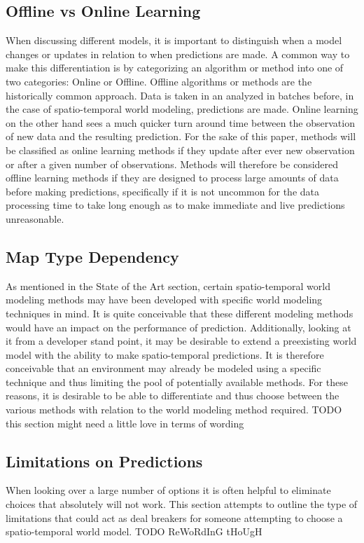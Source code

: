   \subsection{ Offline vs Online Learning }
  When discussing different models, it is important to distinguish when a model
  changes or updates in relation to when predictions are made. A common way to
  make this differentiation is by categorizing an algorithm or method into one of
  two categories: Online or Offline. Offline algorithms or methods are the
  historically common approach. Data is taken in an analyzed in batches before,
  in the case of spatio-temporal world modeling, predictions are made. Online
  learning on the other hand sees a much quicker turn around time between the
  observation of new data and the resulting prediction. \cite{Karp1992} For the sake of this
  paper, methods will be classified as online learning methods if they update
  after ever new observation or after a given number of observations. Methods
  will therefore be considered offline learning methods if they are designed to
  process large amounts of data before making predictions, specifically if it
  is not uncommon for the data processing time to take long enough as to make
  immediate and live predictions unreasonable.

  \subsection{ Map Type Dependency }
  As mentioned in the State of the Art section, certain spatio-temporal world
  modeling methods may have been developed with specific world modeling techniques in
  mind. It is quite conceivable that these different modeling methods would
  have an impact on the performance of prediction. Additionally, looking at it
  from a developer stand point, it may be desirable to extend a preexisting
  world model with the ability to make spatio-temporal predictions. It is
  therefore conceivable that an environment may already be modeled using a
  specific technique and thus limiting the pool of potentially available methods.
  For these reasons, it is desirable to be able to differentiate and thus choose
  between the various methods with relation to the world modeling method
  required. TODO this section might need a little love in terms of wording



  \subsection { Limitations on Predictions }
  When looking over a large number of options it is often helpful to eliminate
  choices that absolutely will not work. This section attempts to outline
  the type of limitations that could act as deal breakers for someone
  attempting to choose a spatio-temporal world model. TODO ReWoRdInG tHoUgH


